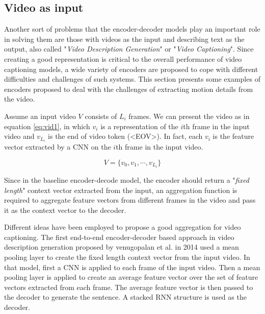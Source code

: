 \documentclass[preprint, 12pt]{elsarticle}
\begin{document}
		\subsection{Video as input}
		Another sort of problems that the encoder-decoder models play an important role in solving them are those with videos as the input and describing text as the output, also called "\textit{Video Description Generation}" or "\textit{Video Captioning}". Since creating a good representation is critical to the overall performance of video captioning models, a wide variety of encoders are proposed to cope with different difficulties and challenges of such systems. This section presents some examples of encoders proposed to deal with the challenges of extracting motion details from the video.
		
		Assume an input video $V$ consists of $L_i$ frames. We can present the video as in equation \eqref{eq:vid1}, in which $v_i$ is a representation of the $i$th frame in the input video and $v_{L_i}$ is the end of video token (<EOV>). In fact, each $v_i$ is the feature vector extracted by a CNN on the $i$th frame in the input video.
		
		\begin{equation}
			V = \{v_0, v_1, \cdots, v_{L_i}\}
			\label{eq:vid1}
		\end{equation}
		
		Since in the baseline encoder-decode model, the encoder should return a "\textit{fixed length}" context vector extracted from the input, an aggregation function is required to aggregate feature vectors from different frames in the video and pass it as the context vector to the decoder. 
		
		Different ideas have been employed to propose a good aggregation for video captioning. The first end-to-end encoder-decoder based approach in video description generation proposed by venugopalan et al. in 2014 \cite{venugopalan2014translating} used a mean pooling layer to create the fixed length context vector from the input video. In that model, first a CNN is applied to each frame of the input video. Then a mean pooling layer is applied to create an average feature vector over the set of feature vectors extracted from each frame. The average feature vector is then passed to the decoder to generate the sentence. A stacked RNN structure is used as the decoder.
		
\end{document}
